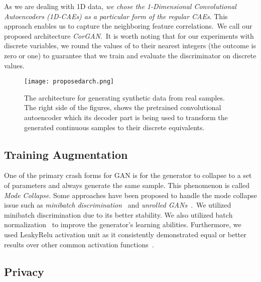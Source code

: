 \documentclass[letterpaper]{article} \usepackage{aaai20}  \usepackage{times}  \usepackage{helvet} \usepackage{courier}  \usepackage[hyphens]{url}  \usepackage{graphicx} \urlstyle{rm} \def\UrlFont{\rm}  \usepackage{graphicx}  \frenchspacing  \setlength{\pdfpagewidth}{8.5in}  \setlength{\pdfpageheight}{11in}
\begin{document}
As we are dealing with 1D data,
\textit{we chose the 1-Dimensional
Convolutional Autoencoders (1D-CAEs) as a particular form of the regular CAEs}.
This approach enables us to capture the neighboring feature correlations.~We call our proposed architecture \textit{CorGAN}.~It is worth noting that for our experiments with discrete variables, we round the values of  to their nearest integers (the outcome is zero or one) to guarantee that we train and evaluate the discriminator on discrete values.


\begin{figure}
\centering
    \texttt{[image: proposedarch.png]}
    \caption[The proposed architecture for synthetic data generation]{The architecture for generating synthetic data from real samples. The right side of the figures, shows the pretrained convolutional autoencoder which its decoder part is being used to transform the generated continuous samples to their discrete equivalents.} \label{fig:proposedarch}
\end{figure}


\subsection{Training Augmentation}\label{sec:Methodsub:TrainingAugmentation}

One of the primary crash forms for GAN is for the generator to collapse to a set of parameters and always generate the same sample.
This phenomenon is called \textit{Mode Collapse}. Some approaches have been proposed to handle the mode collapse issue such as \textit{minibatch discrimination}~\cite{salimans2016improved} and \textit{unrolled GANs}~\cite{metz2016unrolled}.~We utilized minibatch discrimination due to its better stability. We also utilized batch normalization~\cite{ioffe2015batch} to improve the generator's learning abilities. Furthermore, we used LeakyRelu activation unit \cite{maas2013rectifier} as it consistently demonstrated equal or better results over other common activation functions~\cite{xu2015empirical}.







\subsection{Privacy}\label{sec:Methodsub:Privacy}
\end{document}
